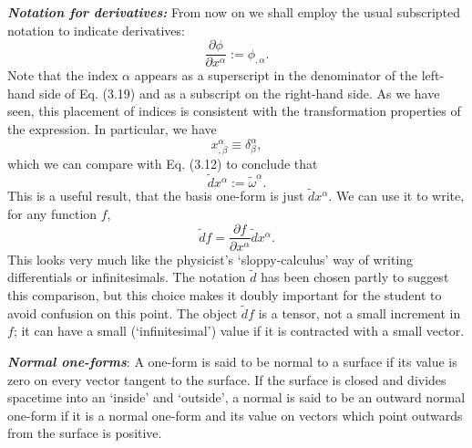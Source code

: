 \documentclass[12pt]{book}
\begin{document}
    \textit{\textbf{Notation for derivatives:}}
    From now on we shall employ the usual subscripted notation to indicate derivatives:
    \[
    \frac{\partial \phi}{\partial x^\alpha} := \phi_{,\alpha}. \tag{3.19}
    \]
    Note that the index \(\alpha\) appears as a superscript in the denominator of the left-hand side of Eq. (3.19) and as a subscript on the right-hand side. As we have seen, this placement of indices is consistent with the transformation properties of the expression. In particular, we have
    \[
    x^\alpha_{,\beta} \equiv \delta^\alpha_\beta,
    \]
    which we can compare with Eq. (3.12) to conclude that
    \[
    \tilde{d}x^\alpha := \tilde{\omega}^\alpha. \tag{3.20}
    \]
    This is a useful result, that the basis one-form is just \(\tilde{d}x^\alpha\). We can use it to write, for any function \(f\),
    \[
    \tilde{d}f = \frac{\partial f}{\partial x^\alpha} \tilde{d}x^\alpha.
    \]
    This looks very much like the physicist’s ‘sloppy-calculus’ way of writing differentials or infinitesimals. The notation \(\tilde{d}\) has been chosen partly to suggest this comparison, but this choice makes it doubly important for the student to avoid confusion on this point. The object \(\tilde{d}f\) is a tensor, not a small increment in \(f\); it can have a small (‘infinitesimal’) value if it is contracted with a small vector.

    \textit{\textbf{Normal one-forms}}: A one-form is said to be normal to a surface if its value is zero on every vector tangent to the surface. If the surface is closed and divides spacetime into an ‘inside’ and ‘outside’, a normal is said to be an outward normal one-form if it is a normal one-form and its value on vectors which point outwards from the surface is positive.
\end{document}
